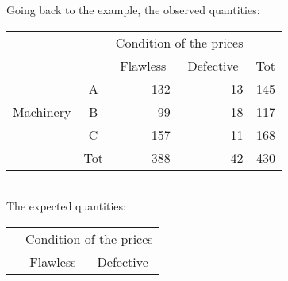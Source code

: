 \begin{frame}
  \begin{footnotesize}
    Going back to the example, the observed quantities:\\
    \vspace*{.2cm}
    \hspace*{2cm}
    \begin{tabular}{|c|c|r|r|r|}
      \cline{3-4}
      \multicolumn{2}{c}{} & \multicolumn{2}{|c|}{Condition of the prices} & \multicolumn{1}{c}{}\\ \cline{3-5}
      \multicolumn{2}{c}{} & \multicolumn{1}{|c|}{\hspace*{.25cm}Flawless\hspace*{.25cm}} & \multicolumn{1}{|c|}{Defective} & \multicolumn{1}{c|}{\hspace*{.25cm}Tot \hspace*{.25cm}}\\ \hline
      & \multicolumn{1}{|c|}{\hspace*{.5cm}A\hspace*{.5cm}} & \multicolumn{1}{|r|}{132} & \multicolumn{1}{|r|}{13} & \multicolumn{1}{|r|}{145}\\ \cline{2-5}
      \multicolumn{1}{|c|}{Machinery} & \multicolumn{1}{|c|}{B} & \multicolumn{1}{|r|}{99} & \multicolumn{1}{|r|}{18} & \multicolumn{1}{|r|}{117}\\ \cline{2-5}
      & \multicolumn{1}{|c|}{C} & \multicolumn{1}{|r|}{157} & \multicolumn{1}{|r|}{11} & \multicolumn{1}{|r|}{168}\\ \hline
      \multicolumn{1}{c}{} & \multicolumn{1}{|c|}{Tot} & \multicolumn{1}{|r|}{388} & \multicolumn{1}{|r|}{42} & \multicolumn{1}{|r|}{430}\\ \cline{2-5}
    \end{tabular}\\
    \vspace*{.4cm}
    The expected quantities:\\
    \vspace*{.2cm}
    \hspace*{2cm}
    \begin{tabular}{|c|c|r|r|}
      \cline{3-4}
      \multicolumn{2}{c}{} & \multicolumn{2}{|c|}{Condition of the prices}\\ \cline{3-4}
      \multicolumn{2}{c}{} & \multicolumn{1}{|c|}{\hspace*{.25cm}Flawless\hspace*{.25cm}} & \multicolumn{1}{|c|}{Defective}\\ \hline

\end{tabular}
\end{footnotesize}
\end{frame}
